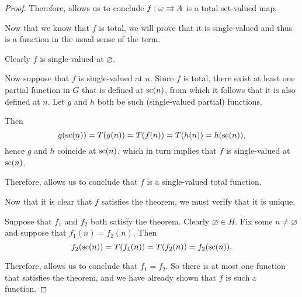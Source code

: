 \begin{proof}
  Therefore,  allows us to conclude \( f: \omega \rightrightarrows A \) is a total set-valued map.

   Now that we know that \( f \) is total, we will prove that it is single-valued and thus is a function in the usual sense of the term.

  Clearly \( f \) is single-valued at \( \varnothing \).

  Now suppose that \( f \) is single-valued at \( n \). Since \( f \) is total, there exist at least one partial function in \( G \) that is defined at \( \op{sc}(n) \), from which it follows that it is also defined at \( n \).  Let \( g \) and \( h \) both be such (single-valued partial) functions.

  Then
  \begin{equation*}
    g(\op{sc}(n)) = T(g(n)) = T(f(n)) = T(h(n)) = h(\op{sc}(n)),
  \end{equation*}
  hence \( g \) and \( h \) coincide at \( \op{sc}(n) \), which in turn implies that \( f \) is single-valued at \( \op{sc}(n) \).

  Therefore,  allows us to conclude that \( f \) is a single-valued total function.

   Now that it is clear that \( f \) satisfies the theorem, we must verify that it is unique.

  Suppose that \( f_1 \) and \( f_2 \) both satisfy the theorem. Clearly \( \varnothing \in H \). Fix some \( n \neq \varnothing \) and suppose that \( f_1(n) = f_2(n) \). Then
  \begin{equation*}
    f_2(\op{sc}(n)) = T(f_1(n)) = T(f_2(n)) = f_2(\op{sc}(n)).
  \end{equation*}

  Therefore,  allows us to conclude that \( f_1 = f_2 \). So there is at most one function that satisfies the theorem, and we have already shown that \( f \) is such a function.
\end{proof}

